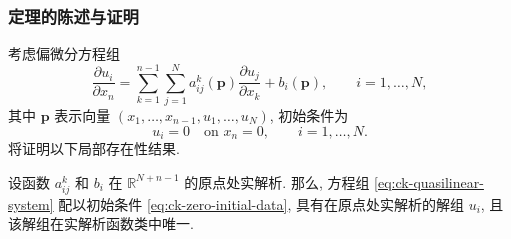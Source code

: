 \subsubsection{定理的陈述与证明}\label{subsec:ck-statement-proof}

考虑偏微分方程组
\begin{equation}\label{eq:ck-quasilinear-system}
\dfrac{\partial u_i}{\partial x_n}=\sum_{k=1}^{n-1}\sum_{j=1}^Na_{ij}^k(\bm{p})\dfrac{\partial u_j}{\partial x_k}+b_i(\bm{p}),\qquad i=1,\ldots,N,
\end{equation}
其中 $\bm{p}$ 表示向量 $(x_1,\ldots,x_{n-1},u_1,\ldots,u_N)$, 初始条件为
\begin{equation}\label{eq:ck-zero-initial-data}
u_i=0\quad\text{on }x_n=0,\qquad i=1,\ldots,N.
\end{equation}
将证明以下局部存在性结果.

\begin{Theorem}
\label{thm:cauchy-kovalevskaya-local-existence}
设函数 $a_{ij}^k$ 和 $b_i$ 在 $\mathbb{R}^{N+n-1}$ 的原点处实解析. 那么, 方程组 \eqref{eq:ck-quasilinear-system} 配以初始条件 \eqref{eq:ck-zero-initial-data}, 具有在原点处实解析的解组 $u_i$, 且该解组在实解析函数类中唯一.
\end{Theorem}

